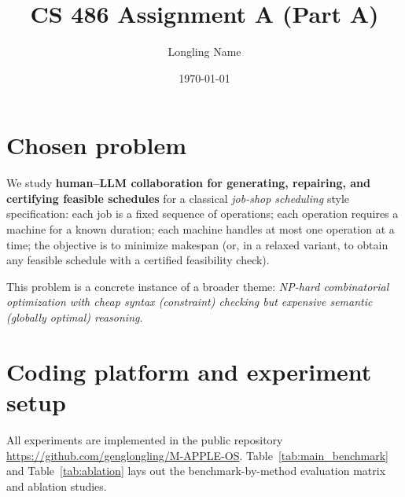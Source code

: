 \documentclass[11pt]{article}
\title{CS 486 Assignment A (Part A)}
\author{Longling Name}
\date{\today}
\begin{document}
\maketitle


\section{Chosen problem}
We study \textbf{human--LLM collaboration for generating, repairing, and certifying feasible schedules} for a classical \emph{job-shop scheduling} style specification: each job is a fixed sequence of operations; each operation requires a machine for a known duration; each machine handles at most one operation at a time; the objective is to minimize makespan (or, in a relaxed variant, to obtain any feasible schedule with a certified feasibility check).

This problem is a concrete instance of a broader theme: \emph{NP-hard combinatorial optimization with cheap \emph{syntax} (constraint) checking but expensive \emph{semantic} (globally optimal) reasoning}.

\section{Coding platform and experiment setup}

All experiments are implemented in the public repository
\url{https://github.com/genglongling/M-APPLE-OS}.
Table~\ref{tab:main_benchmark} and Table~\ref{tab:ablation}  lays out the benchmark-by-method evaluation matrix and ablation studies.
\end{document}
